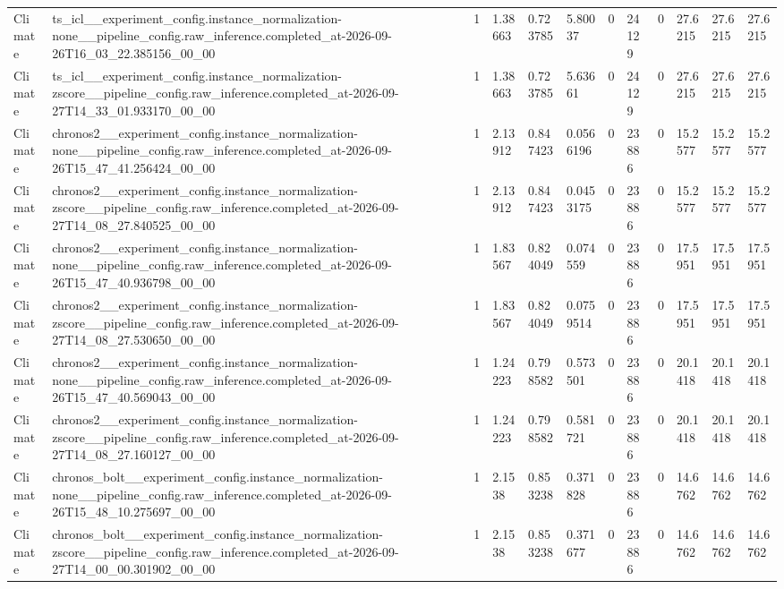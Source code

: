 \begin{tabular}{llllllllllll}
Climate & ts\_icl\_\_experiment\_config.instance\_normalization-none\_\_pipeline\_config.raw\_inference.completed\_at-2026-09-26T16\_03\_22.385156\_00\_00 & 1 & 1.38663 & 0.723785 & 5.80037 & 0 & 24129 & 0 & 27.6215 & 27.6215 & 27.6215 \\
Climate & ts\_icl\_\_experiment\_config.instance\_normalization-zscore\_\_pipeline\_config.raw\_inference.completed\_at-2026-09-27T14\_33\_01.933170\_00\_00 & 1 & 1.38663 & 0.723785 & 5.63661 & 0 & 24129 & 0 & 27.6215 & 27.6215 & 27.6215 \\
Climate & chronos2\_\_experiment\_config.instance\_normalization-none\_\_pipeline\_config.raw\_inference.completed\_at-2026-09-26T15\_47\_41.256424\_00\_00 & 1 & 2.13912 & 0.847423 & 0.0566196 & 0 & 23886 & 0 & 15.2577 & 15.2577 & 15.2577 \\
Climate & chronos2\_\_experiment\_config.instance\_normalization-zscore\_\_pipeline\_config.raw\_inference.completed\_at-2026-09-27T14\_08\_27.840525\_00\_00 & 1 & 2.13912 & 0.847423 & 0.0453175 & 0 & 23886 & 0 & 15.2577 & 15.2577 & 15.2577 \\
Climate & chronos2\_\_experiment\_config.instance\_normalization-none\_\_pipeline\_config.raw\_inference.completed\_at-2026-09-26T15\_47\_40.936798\_00\_00 & 1 & 1.83567 & 0.824049 & 0.074559 & 0 & 23886 & 0 & 17.5951 & 17.5951 & 17.5951 \\
Climate & chronos2\_\_experiment\_config.instance\_normalization-zscore\_\_pipeline\_config.raw\_inference.completed\_at-2026-09-27T14\_08\_27.530650\_00\_00 & 1 & 1.83567 & 0.824049 & 0.0759514 & 0 & 23886 & 0 & 17.5951 & 17.5951 & 17.5951 \\
Climate & chronos2\_\_experiment\_config.instance\_normalization-none\_\_pipeline\_config.raw\_inference.completed\_at-2026-09-26T15\_47\_40.569043\_00\_00 & 1 & 1.24223 & 0.798582 & 0.573501 & 0 & 23886 & 0 & 20.1418 & 20.1418 & 20.1418 \\
Climate & chronos2\_\_experiment\_config.instance\_normalization-zscore\_\_pipeline\_config.raw\_inference.completed\_at-2026-09-27T14\_08\_27.160127\_00\_00 & 1 & 1.24223 & 0.798582 & 0.581721 & 0 & 23886 & 0 & 20.1418 & 20.1418 & 20.1418 \\
Climate & chronos\_bolt\_\_experiment\_config.instance\_normalization-none\_\_pipeline\_config.raw\_inference.completed\_at-2026-09-26T15\_48\_10.275697\_00\_00 & 1 & 2.1538 & 0.853238 & 0.371828 & 0 & 23886 & 0 & 14.6762 & 14.6762 & 14.6762 \\
Climate & chronos\_bolt\_\_experiment\_config.instance\_normalization-zscore\_\_pipeline\_config.raw\_inference.completed\_at-2026-09-27T14\_00\_00.301902\_00\_00 & 1 & 2.1538 & 0.853238 & 0.371677 & 0 & 23886 & 0 & 14.6762 & 14.6762 & 14.6762 \\

\end{tabular}
